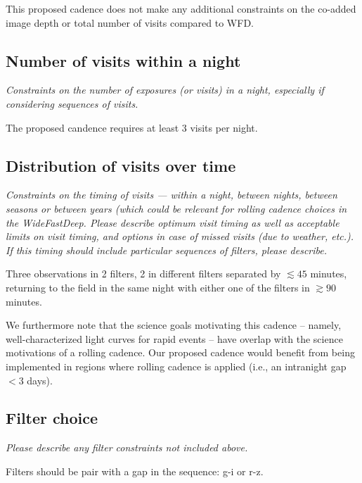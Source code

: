 \documentclass[12pt, letterpaper]{article}
\begin{document}
This proposed cadence does not make any additional constraints on the co-added image depth or total number of visits compared to WFD. 


\subsection{Number of visits within a night}
\begin{footnotesize}{\it Constraints on the number of exposures (or visits) in a night, especially if considering sequences of visits.}
\end{footnotesize}

The proposed candence requires at least 3 visits per night.

\subsection{Distribution of visits over time}
\begin{footnotesize}{\it Constraints on the timing of visits --- within a night, between nights, between seasons or between years (which could be relevant for rolling cadence choices in the WideFastDeep. Please describe optimum visit timing as well as acceptable limits on visit timing, and options in case of missed visits (due to weather, etc.). If this timing should include particular sequences of filters, please describe.}
\end{footnotesize}

Three observations in 2 filters, 2 in different filters separated by $\lesssim45$ minutes, returning to the field in the same night with either one of the filters in $\gtrsim90$ minutes.

We furthermore note that the science goals motivating this cadence -- namely, well-characterized light curves for rapid events -- have overlap with the science motivations of a rolling cadence. Our proposed cadence would benefit from being implemented in regions where rolling cadence is applied (i.e., an intranight gap $<3$ days).


\subsection{Filter choice}
\begin{footnotesize}
{\it Please describe any filter constraints not included above.}
\end{footnotesize}

Filters should be pair with a gap in the sequence: g-i or r-z.                                                       
\end{document}
